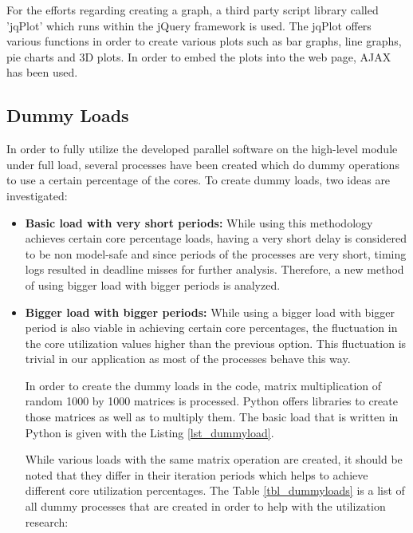 For the efforts regarding creating a graph, a third party script library called 'jqPlot' \cite{jqplot} which runs within the jQuery framework is used.  The jqPlot offers various functions in order to create various plots such as bar graphs, line graphs, pie charts and 3D plots. In order to embed the plots into the web page, AJAX has been used.

\subsection{Dummy Loads}
In order to fully utilize the developed parallel software on the high-level module under full load, several processes have been created which do dummy operations to use a certain percentage of the cores. To create dummy loads, two ideas are investigated:
\begin{itemize}
	\item \textbf{Basic load with very short periods:} While using this methodology achieves certain core percentage loads, having a very short delay is considered to be non model-safe and since periods of the processes are very short, timing logs resulted in deadline misses for further analysis. Therefore, a new method of using bigger load with bigger periods is analyzed.
	
	\item \textbf{Bigger load with bigger periods:} While using a bigger load with bigger period is also viable in achieving certain core percentages, the fluctuation in the core utilization values higher than the previous option. This fluctuation is trivial in our application as most of the processes behave this way.
	
	
	
	In order to create the dummy loads in the code, matrix multiplication of random 1000 by 1000 matrices is processed. Python offers libraries to create those matrices as well as to multiply them. The basic load that is written in Python is given with the Listing \ref{lst_dummyload}.
	
	While various loads with the same matrix operation are created, it should be noted that they differ in their iteration periods which helps to achieve different core utilization percentages. The Table \ref{tbl_dummyloads} is a list of all dummy processes that are created in order to help with the utilization research:
	

\end{itemize}
